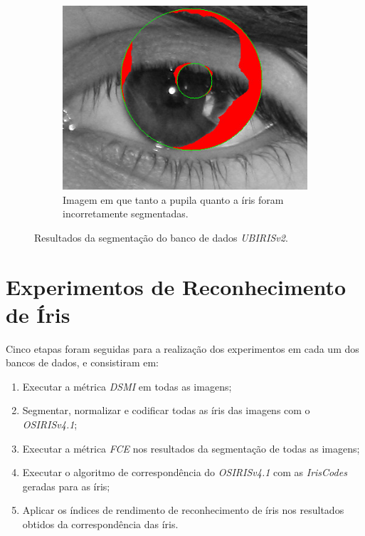 \begin{figure}[h!]
\begin{subfigure}{.25\textwidth}
\includegraphics[width=\linewidth]{img/Resultados/ubirisv2/ubirisv2_seg_ruim2.jpg}
\caption{Imagem em que tanto a pupila quanto a íris foram incorretamente segmentadas.}
\end{subfigure}
\caption{Resultados da segmentação do banco de dados \textit{UBIRISv2}.}
\label{fig:experimentos:segmentacoes:ubirisv2}
\end{figure}

\FloatBarrier

\section{Experimentos de Reconhecimento de Íris}\label{sec:experimentos:experimentos}

\par Cinco etapas foram seguidas para a realização dos experimentos em cada um dos bancos de dados, e consistiram em:

\begin{enumerate}
    \item Executar a métrica \textit{\acrshort{DSMI}} em todas as imagens;
    \item Segmentar, normalizar e codificar todas as íris das imagens com o \textit{OSIRISv4.1};
    \item Executar a métrica \textit{\acrshort{FCE}} nos resultados da segmentação de todas as imagens;
    \item Executar o algoritmo de correspondência do \textit{OSIRISv4.1} com as \textit{IrisCodes} geradas para as íris;
    \item Aplicar os índices de rendimento de reconhecimento de íris nos resultados obtidos da correspondência das íris.
\end{enumerate}


